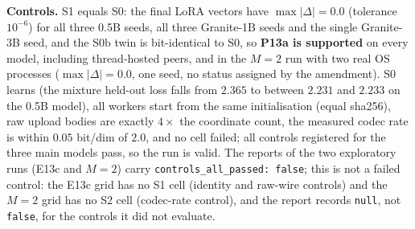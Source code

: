 \documentclass[11pt,a4paper]{article}
\begin{document}
\textbf{Controls.} S1 equals S0: the final LoRA vectors have $\max|\Delta| = 0.0$ (tolerance $10^{-6}$) for all three 0.5B seeds, all three Granite-1B seeds and the single Granite-3B seed, and the S0b twin is bit-identical to S0, so \textbf{P13a is supported} on every model, including thread-hosted peers, and in the $M=2$ run with two real OS processes ($\max|\Delta|=0.0$, one seed, no status assigned by the amendment). S0 learns (the mixture held-out loss falls from $2.365$ to between $2.231$ and $2.233$ on the 0.5B model), all workers start from the same initialisation (equal sha256), raw upload bodies are exactly $4\times$ the coordinate count, the measured codec rate is within $0.05$ bit/dim of $2.0$, and no cell failed; all controls registered for the three main models pass, so the run is valid. The reports of the two exploratory runs (E13c and $M=2$) carry \texttt{controls\_all\_passed: false}; this is not a failed control: the E13c grid has no S1 cell (identity and raw-wire controls) and the $M=2$ grid has no S2 cell (codec-rate control), and the report records \texttt{null}, not \texttt{false}, for the controls it did not evaluate.

\begin{table}[ht!]
\centering
\caption{E13 registered runs and the two exploratory replications ($\pm$ = 95\,\% half-width, $df=2$). $\rho$ is the registered retention $(L_{0}-L_{\mathrm{S2}})/(L_{0}-L_{\mathrm{S0}})$ per seed, the share of the synchronous baseline's held-out improvement that the all-on swarm keeps; the viability bar is $0.5$. ``S0 gain'' is the per-seed range of $L_0-L_{\mathrm{S0}}$ in nats. The upload ratio is the measured size of the S2 upload bodies over the raw fp32 delta bytes (ideal entropy-coded value $0.062$). Source receipts: \texttt{E13\_swarm\_local\_report*.json} and \texttt{E13\_swarm\_local\_predictions*.json}.}
\label{tab:e13}
\vspace{0.35em}
\end{table}
\end{document}
